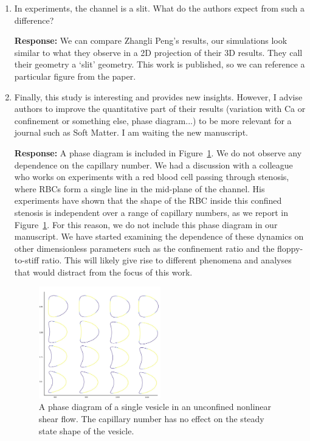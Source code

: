 \documentclass[11pt]{article}
\begin{document}
\begin{enumerate}
\item In experiments, the channel is a slit. What do the authors expect
  from such a difference?

\noindent
{\bf Response:} We can compare Zhangli Peng's results, our simulations
look similar to what they observe in a 2D projection of their 3D
results. They call their geometry a `slit' geometry. This work is
published, so we can reference a particular figure from the paper.

\item Finally, this study is interesting and provides new insights.
  However, I advise authors to improve the quantitative part of their
  results (variation with Ca or confinement or something else, phase
  diagram...) to be more relevant for a journal such as Soft Matter. I
  am waiting the new manuscript.

\noindent
{\bf Response:} A phase diagram is included in Figure~\ref{fig:Phase}.
We do not observe any dependence on the capillary number. We had a
discussion with a colleague who works on experiments
with a red blood cell passing through stenosis, where RBCs form a single line in the mid-plane of the channel.
 His experiments have shown that the
shape of the RBC inside this confined stenosis is independent over a
range of capillary numbers, as we report in Figure~\ref{fig:Phase}. For
this reason, we do not include this phase diagram in our manuscript. We have
started examining the dependence of these dynamics on other
dimensionless parameters such as the confinement ratio and the
floppy-to-stiff ratio. This will likely give rise to different phenomena and analyses  that would distract
from the focus of this work.
\begin{figure}
\centering
  \includegraphics[width=0.5\textwidth]{phaseDiagram.jpg}
  \caption{\label{fig:Phase} A phase diagram of a single vesicle in an unconfined
  nonlinear shear flow. The capillary number has no effect on the steady
  state shape of the vesicle.}
\end{figure}


\end{enumerate}
\end{document}
